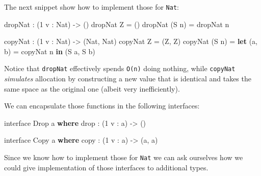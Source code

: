\documentclass[
]{article}
\newenvironment{Shaded}{}{}
\newcommand{\DataTypeTok}[1]{\textcolor[rgb]{0.56,0.13,0.00}{#1}}
\newcommand{\DecValTok}[1]{\textcolor[rgb]{0.25,0.63,0.44}{#1}}
\newcommand{\FunctionTok}[1]{\textcolor[rgb]{0.02,0.16,0.49}{#1}}
\newcommand{\KeywordTok}[1]{\textcolor[rgb]{0.00,0.44,0.13}{\textbf{#1}}}
\newcommand{\NormalTok}[1]{#1}
\newcommand{\OperatorTok}[1]{\textcolor[rgb]{0.40,0.40,0.40}{#1}}
\newcommand{\OtherTok}[1]{\textcolor[rgb]{0.00,0.44,0.13}{#1}}
\begin{document}
The next snippet show how to implement those for \texttt{Nat}:

\begin{Shaded}
\begin{Highlighting}[]
\NormalTok{dropNat }\OperatorTok{:}\NormalTok{ (}\DecValTok{1}\NormalTok{ v }\OperatorTok{:} \DataTypeTok{Nat}\NormalTok{) }\OtherTok{{-}\textgreater{}}\NormalTok{ ()}
\NormalTok{dropNat }\DataTypeTok{Z} \OtherTok{=}\NormalTok{ ()}
\NormalTok{dropNat (}\DataTypeTok{S}\NormalTok{ n) }\OtherTok{=}\NormalTok{ dropNat n}

\NormalTok{copyNat }\OperatorTok{:}\NormalTok{ (}\DecValTok{1}\NormalTok{ v }\OperatorTok{:} \DataTypeTok{Nat}\NormalTok{) }\OtherTok{{-}\textgreater{}}\NormalTok{ (}\DataTypeTok{Nat}\NormalTok{, }\DataTypeTok{Nat}\NormalTok{)}
\NormalTok{copyNat }\DataTypeTok{Z} \OtherTok{=}\NormalTok{ (}\DataTypeTok{Z}\NormalTok{, }\DataTypeTok{Z}\NormalTok{)}
\NormalTok{copyNat (}\DataTypeTok{S}\NormalTok{ n) }\OtherTok{=} \KeywordTok{let}\NormalTok{ (a, b) }\OtherTok{=}\NormalTok{ copyNat n }\KeywordTok{in}
\NormalTok{                    (}\DataTypeTok{S}\NormalTok{ a, }\DataTypeTok{S}\NormalTok{ b)}
\end{Highlighting}
\end{Shaded}

Notice that \texttt{dropNat} effectively spends \texttt{O(n)} doing
nothing, while \texttt{copyNat} \emph{simulates} allocation by
constructing a new value that is identical and takes the same space as
the original one (albeit very inefficiently).

We can encapsulate those functions in the following interfaces:

\begin{Shaded}
\begin{Highlighting}[]
\NormalTok{interface }\DataTypeTok{Drop}\NormalTok{ a }\KeywordTok{where}
    \FunctionTok{drop} \OperatorTok{:}\NormalTok{ (}\DecValTok{1}\NormalTok{ v }\OperatorTok{:}\NormalTok{ a) }\OtherTok{{-}\textgreater{}}\NormalTok{ ()}

\NormalTok{interface }\DataTypeTok{Copy}\NormalTok{ a }\KeywordTok{where}
\NormalTok{    copy }\OperatorTok{:}\NormalTok{ (}\DecValTok{1}\NormalTok{ v }\OperatorTok{:}\NormalTok{ a) }\OtherTok{{-}\textgreater{}}\NormalTok{ (a, a)}
\end{Highlighting}
\end{Shaded}

Since we know how to implement those for \texttt{Nat} we can ask
ourselves how we could give implementation of those interfaces to
additional types.
\end{document}

